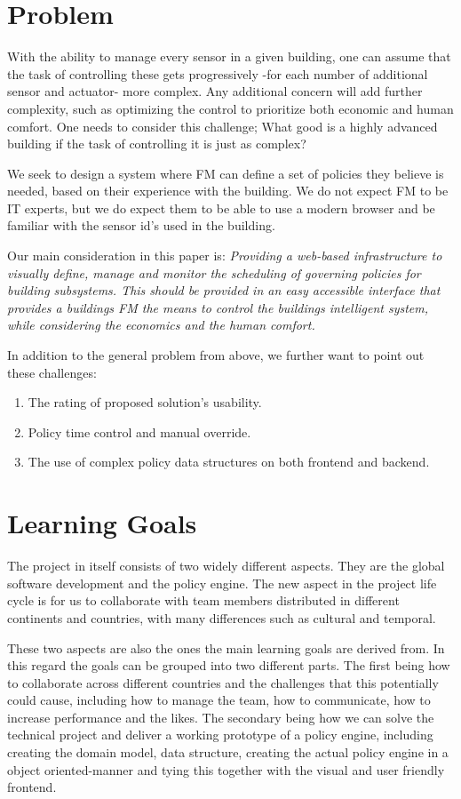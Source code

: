 \section{Problem} \label{sec:problem}
With the ability to manage every sensor in a given building, one can assume that the task of controlling these gets progressively -for each number of additional sensor and actuator- more complex. Any additional concern will add further complexity, such as optimizing the control to prioritize both economic and human comfort. One needs to consider this challenge; What good is a highly advanced building if the task of controlling it is just as complex?

We seek to design a system where FM can define a set of policies they believe is needed, based on their experience with the building. We do not expect FM to be IT experts, but we do expect them to be able to use a modern browser and be familiar with the sensor id's used in the building.

Our main consideration in this paper is: \textit{Providing a web-based infrastructure to visually define, manage and monitor the scheduling of governing policies for building subsystems. This should be provided in an easy accessible interface that provides a buildings FM the means to control the buildings intelligent system, while considering the economics and the human comfort.}

In addition to the general problem from above, we further want to point out these challenges:
\begin{enumerate}
	\item The rating of proposed solution's usability.
	\item Policy time control and manual override.
	\item The use of complex policy data structures on both frontend and backend.
\end{enumerate}

\section{Learning Goals} \label{sec:learninggoals}
The project in itself consists of two widely different aspects. They are the global software development and the policy engine. The new aspect in the project life cycle is for us to collaborate with team members distributed in different continents and countries, with many differences such as cultural and temporal.

These two aspects are also the ones the main learning goals are derived from. In this regard the goals can be grouped into two different parts. The first being how to collaborate across different countries and the challenges that this potentially could cause, including how to manage the team, how to communicate, how to increase performance and the likes. The secondary being how we can solve the technical project and deliver a working prototype of a policy engine, including creating the domain model, data structure, creating the actual policy engine in a object oriented-manner and tying this together with the visual and user friendly frontend.

